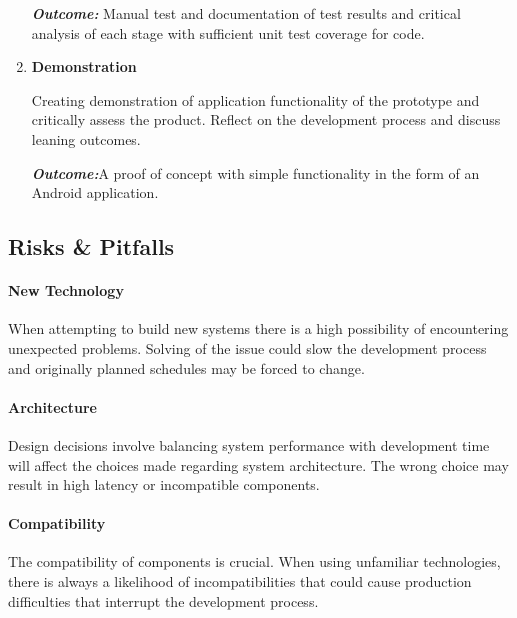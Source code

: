 \documentclass[a4paper, 11pt]{article}
\begin{document}
\begin{enumerate}
\begin{flushleft}
	\emph{\textbf{Outcome:}} Manual test and documentation of test results and critical analysis of each stage with sufficient unit test coverage for code.
	\vspace{\baselineskip}
  	\end{flushleft}
	   \item \textbf{Demonstration}
   	\begin{flushleft}Creating demonstration of application functionality of the prototype and critically assess the product. Reflect on the development process and discuss leaning outcomes. 
	
	\emph{\textbf{Outcome:}}A proof of concept with simple functionality in the form of an Android application.
	  	\end{flushleft}
\end{enumerate}
\vspace{\baselineskip}


\vspace{\baselineskip}
\vspace{\baselineskip}
\vspace{\baselineskip}

\subsection{Risks \& Pitfalls}
\paragraph{New Technology}When attempting to build new systems there is a high possibility of encountering unexpected problems. Solving of the issue could slow the development process and originally planned schedules may be forced to change. 

\paragraph{Architecture}Design decisions involve balancing system performance with development time will affect the choices made regarding system architecture. The wrong choice may result in high latency or incompatible components. 

\paragraph{Compatibility}The compatibility of components is crucial. When using unfamiliar technologies, there is always a likelihood of incompatibilities that could cause production difficulties that interrupt the development process. 
\end{document}
